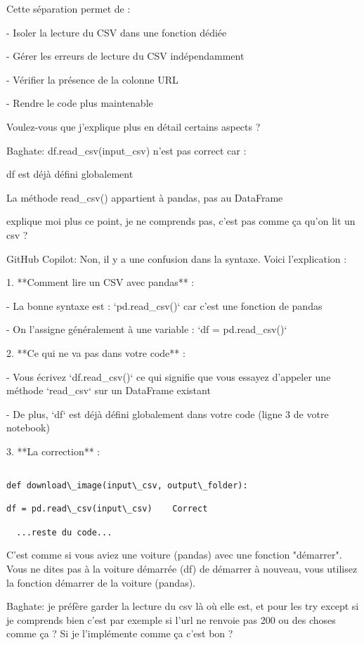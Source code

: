 Cette séparation permet de :

- Isoler la lecture du CSV dans une fonction dédiée

- Gérer les erreurs de lecture du CSV indépendamment

- Vérifier la présence de la colonne URL

- Rendre le code plus maintenable

Voulez-vous que j'explique plus en détail certains aspects ?

Baghate: df.read\_csv(input\_csv) n'est pas correct car :

df est déjà défini globalement

La méthode read\_csv() appartient à pandas, pas au DataFrame

explique moi plus ce point, je ne comprends pas, c'est pas comme ça qu'on lit un csv ?

GitHub Copilot: Non, il y a une confusion dans la syntaxe. Voici l'explication :

1. **Comment lire un CSV avec pandas** :

- La bonne syntaxe est : `pd.read\_csv()` car c'est une fonction de pandas

- On l'assigne généralement à une variable : `df = pd.read\_csv()`

2. **Ce qui ne va pas dans votre code** :

- Vous écrivez `df.read\_csv()` ce qui signifie que vous essayez d'appeler une méthode `read\_csv` sur un DataFrame existant

- De plus, `df` est déjà défini globalement dans votre code (ligne 3 de votre notebook)

3. **La correction** :

\begin{verbatim}

def download\_image(input\_csv, output\_folder):

df = pd.read\_csv(input\_csv)    Correct

  ...reste du code...

\end{verbatim}

C'est comme si vous aviez une voiture (pandas) avec une fonction "démarrer". Vous ne dites pas à la voiture démarrée (df) de démarrer à nouveau, vous utilisez la fonction démarrer de la voiture (pandas).

Baghate: je préfère garder la lecture du csv là où elle est, et pour les try except si je comprends bien c'est par exemple si l'url ne renvoie pas 200 ou des choses comme ça ? Si je l'implémente comme ça c'est bon ?

